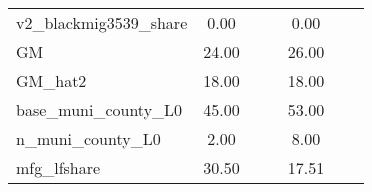 \begin{table}[htbp]
\begin{tabular}{l*{2}{ccc}}
v2\_blackmig3539\_share&        0.00&            &            &        0.00&            &            \\
GM                  &       24.00&            &            &       26.00&            &            \\
GM\_hat2             &       18.00&            &            &       18.00&            &            \\
base\_muni\_county\_L0 &       45.00&            &            &       53.00&            &            \\
n\_muni\_county\_L0    &        2.00&            &            &        8.00&            &            \\
mfg\_lfshare         &       30.50&            &            &       17.51&            &            \\
\bottomrule
\end{tabular}
\end{table}
